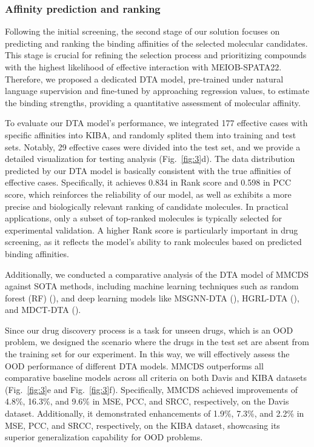 \documentclass[unnumsec,webpdf,contemporary,large]{oup-authoring-template}%
\theoremstyle{thmstyleone}%
\theoremstyle{thmstyletwo}%
\theoremstyle{thmstylethree}%
\begin{document}
\subsubsection*{Affinity prediction and ranking} %

Following the initial screening, the second stage of our solution focuses on predicting and ranking the binding affinities of the selected molecular candidates. This stage is crucial for refining the selection process and prioritizing compounds with the highest likelihood of effective interaction with MEIOB-SPATA22. Therefore, we proposed a dedicated DTA model, pre-trained under natural language supervision and fine-tuned by approaching regression values, to estimate the binding strengths, providing a quantitative assessment of molecular affinity.

To evaluate our DTA model's performance, we integrated 177 effective cases with specific affinities into KIBA, and randomly splited them into training and test sets. Notably, 29 effective cases were divided into the test set, and we provide a detailed visualization for testing analysis (Fig.~\ref{fig:3}d). The data distribution predicted by our DTA model is basically consistent with the true affinities of effective cases. Specifically, it achieves 0.834 in Rank score and 0.598 in PCC score, which reinforces the reliability of our model, as well as exhibits a more precise and biologically relevant ranking of candidate molecules. In practical applications, only a subset of top-ranked molecules is typically selected for experimental validation. A higher Rank score is particularly important in drug screening, as it reflects the model's ability to rank molecules based on predicted binding affinities.


Additionally, we conducted a comparative analysis of the DTA model of MMCDS against SOTA methods, including machine learning techniques such as random forest (RF) (\citealt{48,49}), and deep learning models like MSGNN-DTA (\citealt{50}), HGRL-DTA (\citealt{51}), and MDCT-DTA (\citealt{27}).

Since our drug discovery process is a task for unseen drugs, which is an OOD problem, we designed the scenario where the drugs in the test set are absent from the training set for our experiment. In this way, we will effectively assess the OOD performance of different DTA models. MMCDS outperforms all comparative baseline models across all criteria on both Davis and KIBA datasets (Fig.~\ref{fig:3}e and Fig.~\ref{fig:3}f). Specifically, MMCDS achieved improvements of 4.8\%, 16.3\%, and 9.6\% in MSE, PCC, and SRCC, respectively, on the Davis dataset. Additionally, it demonstrated enhancements of 1.9\%, 7.3\%, and 2.2\% in MSE, PCC, and SRCC, respectively, on the KIBA dataset, showcasing its superior generalization capability for OOD problems.
\end{document}

